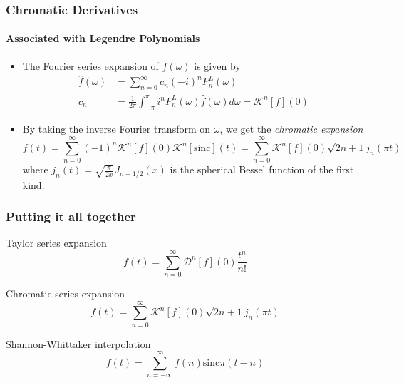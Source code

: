 \documentclass{beamer}
\begin{document}
\begin{frame}
\frametitle{Chromatic Derivatives}
\framesubtitle{Associated with Legendre Polynomials}
\begin{itemize}
	\item The Fourier series expansion of $\hat{f}(\omega)$ is given by
		 \begin{align*}
			\hat{f}(\omega)	&= \sum_{n=0}^{\infty} c_n (-i)^n P_n^L(\omega) \\
			c_n							&= \frac{1}{2\pi} \int_{-\pi}^{\pi} i^n P_n^L(\omega) \hat{f}(\omega) d\omega
										= \mathcal{K}^n[f](0)
		\end{align*}
	\item By taking the inverse Fourier transform on $\omega$, we get the \textit{chromatic expansion}
		\begin{equation*}
			f(t)	= \sum_{n=0}^{\infty} (-1)^n  \mathcal{K}^n[f](0) \mathcal{K}^n[\mathrm{sinc}](t)
					= \sum_{n=0}^{\infty} \mathcal{K}^n[f](0) \sqrt{2n+1} j_n(\pi t)
		\end{equation*}
		where $j_n(t) = \sqrt{\frac{\pi}{2x}}J_{n+1/2}(x)$ is the spherical Bessel function of the first kind.
\end{itemize}
\end{frame}


\begin{frame}
\frametitle{Putting it all together}

\begin{block}{Taylor series expansion}
\begin{equation*}
	f(t) = \sum_{n=0}^{\infty} \mathcal{D}^n[f](0) \frac{t^n}{n!}
\end{equation*}
\end{block}

\begin{block}{Chromatic series expansion}
\begin{equation*}
	f(t) = \sum_{n=0}^{\infty} \mathcal{K}^n[f](0) \sqrt{2n+1} j_n(\pi t)
\end{equation*}
\end{block}

\begin{block}{Shannon-Whittaker interpolation}
\begin{equation*}
	f(t) = \sum_{n=-\infty}^{\infty} f(n) \mathrm{sinc}{\pi(t-n)}
\end{equation*}
\end{block}

\end{frame}
\end{document}
